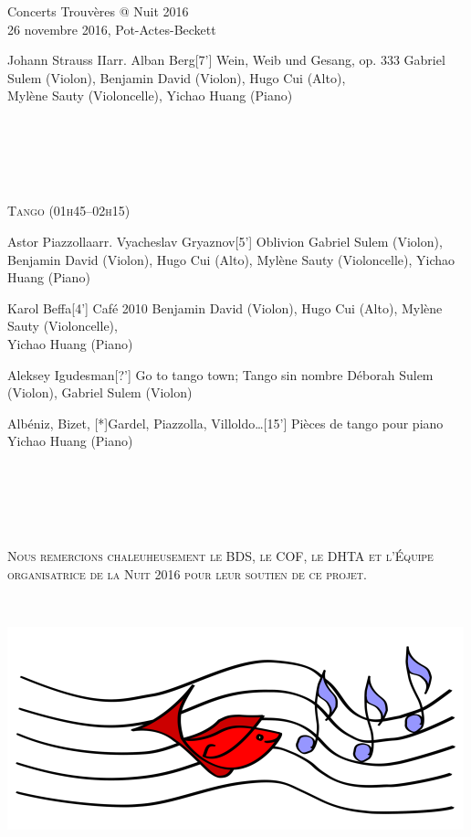 \documentclass[a4paper,11pt,poets,durations]{ConcProg}
\begin{document}
{\begin{programme}{
    Concerts Trouvères @ Nuit 2016
\\  {\normalsize 26 novembre 2016, Pot-Actes-Beckett}
}
\begin{part}[]
\begin{composition}{Johann Strauss II}{arr. Alban Berg}{[7'] Wein, Weib und Gesang, op. 333}{}
      {\small Gabriel Sulem (Violon), Benjamin David (Violon), Hugo Cui (Alto),\\Mylène Sauty (Violoncelle), Yichao Huang (Piano)}
    \end{composition}\\
~\\
~\\
~\\
\begin{center}
\textsc{Tango (01h45--02h15)}
\end{center}
    \begin{composition}{Astor Piazzolla}{arr. Vyacheslav Gryaznov}{[5'] Oblivion}{}
      {\small Gabriel Sulem (Violon), Benjamin David (Violon), Hugo Cui (Alto), Mylène Sauty (Violoncelle), Yichao Huang (Piano)}
    \end{composition}
    \begin{composition}{Karol Beffa}{}{[4'] Café 2010}{}
      {\small Benjamin David (Violon), Hugo Cui (Alto), Mylène Sauty (Violoncelle),\\Yichao Huang (Piano)}
    \end{composition}
    \begin{composition}{Aleksey Igudesman}{}{[?'] Go to tango town; Tango sin nombre}{}
      {\small Déborah Sulem (Violon), Gabriel Sulem (Violon)}
    \end{composition}
    \begin{composition}{Albéniz, Bizet, [*]Gardel, Piazzolla, Villoldo\dots}{}{[15'] Pièces de tango pour piano}{}
      {\small Yichao Huang (Piano)}
    \end{composition}\\
~\\
~\\
~\\
\begin{center}
\textsc{Nous remercions chaleuheusement le BDS, le COF, le DHTA et l'Équipe organisatrice de la Nuit 2016 pour leur soutien de ce projet.}
\end{center}
~\\
  \end{part}
\end{programme}
}
\begin{center}
\includegraphics[scale=3]{logo.png}
\end{center}
\end{document}

